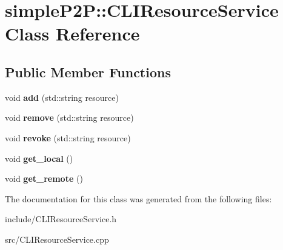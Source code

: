 \hypertarget{classsimpleP2P_1_1CLIResourceService}{}\section{simple\+P2P\+:\+:C\+L\+I\+Resource\+Service Class Reference}
\label{classsimpleP2P_1_1CLIResourceService}
\subsection*{Public Member Functions}
\begin{DoxyCompactItemize}
\item 
\mbox{\label{classsimpleP2P_1_1CLIResourceService_af76d4cbe6d552558f25bdd998385a4d2}} 
void {\bfseries add} (std\+::string resource)
\item 
\mbox{\label{classsimpleP2P_1_1CLIResourceService_a6af01ac5827517c7d33c75f22ce048b8}} 
void {\bfseries remove} (std\+::string resource)
\item 
\mbox{\label{classsimpleP2P_1_1CLIResourceService_af30cc660bf2cc27fc6bb555e381fb499}} 
void {\bfseries revoke} (std\+::string resource)
\item 
\mbox{\label{classsimpleP2P_1_1CLIResourceService_a88c2d0e103214a2829a68b11a15b6d10}} 
void {\bfseries get\+\_\+local} ()
\item 
\mbox{\label{classsimpleP2P_1_1CLIResourceService_aafc90988c9a344cf2d52b35c2eb40cc0}} 
void {\bfseries get\+\_\+remote} ()
\end{DoxyCompactItemize}


The documentation for this class was generated from the following files\+:\begin{DoxyCompactItemize}
\item 
include/C\+L\+I\+Resource\+Service.\+h\item 
src/C\+L\+I\+Resource\+Service.\+cpp\end{DoxyCompactItemize}

